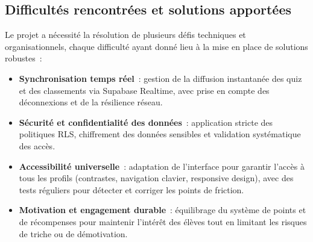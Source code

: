 \documentclass[a4paper,11pt]{report}
\begin{document}
\subsection{Difficultés rencontrées et solutions apportées}
Le projet a nécessité la résolution de plusieurs défis techniques et organisationnels, chaque difficulté ayant donné lieu à la mise en place de solutions robustes :
\begin{itemize}
    \item \textbf{Synchronisation temps réel} : gestion de la diffusion instantanée des quiz et des classements via Supabase Realtime, avec prise en compte des déconnexions et de la résilience réseau.
    \item \textbf{Sécurité et confidentialité des données} : application stricte des politiques RLS, chiffrement des données sensibles et validation systématique des accès.
    \item \textbf{Accessibilité universelle} : adaptation de l'interface pour garantir l'accès à tous les profils (contrastes, navigation clavier, responsive design), avec des tests réguliers pour détecter et corriger les points de friction.
    \item \textbf{Motivation et engagement durable} : équilibrage du système de points et de récompenses pour maintenir l'intérêt des élèves tout en limitant les risques de triche ou de démotivation.
\end{itemize}
\end{document}
